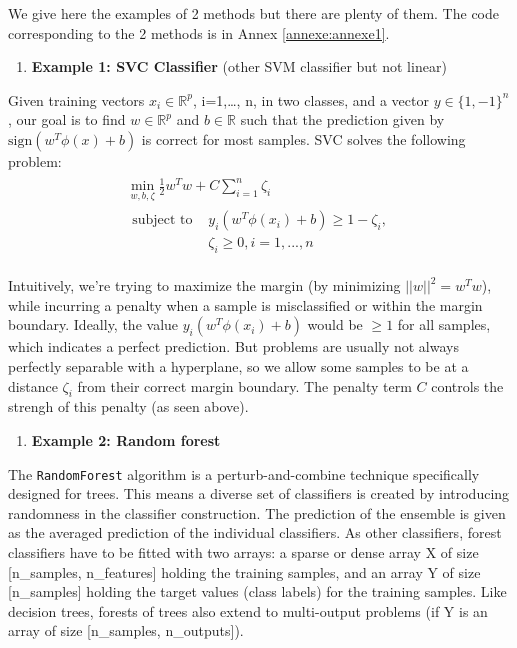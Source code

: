 \documentclass[10pt,a4paper]{article}
\providecommand{\tightlist}{%
  \setlength{\parskip}{0pt}
  }
\theoremstyle{break}
\begin{document}
We give here the examples of 2 methods but there are plenty of them. The code corresponding to the 2 methods is in Annex \ref{annexe:annexe1}.

\begin{enumerate}
\def\labelenumi{\arabic{enumi}.}
\tightlist
\item
  \textbf{Example 1: SVC Classifier} (other SVM classifier but not linear)
\end{enumerate}

Given training vectors \(x_i \in \mathbb{R}^p\), i=1,\ldots{}, n, in two classes, and a vector \(y \in \{1, -1\}^n\)
, our goal is to find \(w \in \mathbb{R}^p\) and \(b \in \mathbb{R}\) such that the prediction given by \(\text{sign} (w^T\phi(x) + b)\) is correct for most samples.
SVC solves the following problem:
\begin{align}\begin{aligned}\min_ {w, b, \zeta} \frac{1}{2} w^T w + C \sum_{i=1}^{n} \zeta_i\\\begin{split}\textrm {subject to } & y_i (w^T \phi (x_i) + b) \geq 1 - \zeta_i,\\
& \zeta_i \geq 0, i=1, ..., n\end{split}\end{aligned}\end{align}

Intuitively, we're trying to maximize the margin (by minimizing \(||w||^2 = w^Tw\)), while incurring a penalty when a sample is misclassified or within the margin boundary. Ideally, the value \(y_i (w^T \phi (x_i) + b)\) would be \(\geq 1\) for all samples, which indicates a perfect prediction. But problems are usually not always perfectly separable with a hyperplane, so we allow some samples to be at a distance \(\zeta_i\) from their correct margin boundary. The penalty term \(C\) controls the strengh of this penalty (as seen above).

\begin{enumerate}
\def\labelenumi{\arabic{enumi}.}
\setcounter{enumi}{1}
\tightlist
\item
  \textbf{Example 2: Random forest}
\end{enumerate}

The \texttt{RandomForest} algorithm is a perturb-and-combine technique specifically designed for trees. This means a diverse set of classifiers is created by introducing randomness in the classifier construction. The prediction of the ensemble is given as the averaged prediction of the individual classifiers. As other classifiers, forest classifiers have to be fitted with two arrays: a sparse or dense array X of size {[}n\_samples, n\_features{]} holding the training samples, and an array Y of size {[}n\_samples{]} holding the target values (class labels) for the training samples. Like decision trees, forests of trees also extend to multi-output problems (if Y is an array of size {[}n\_samples, n\_outputs{]}).
\end{document}
